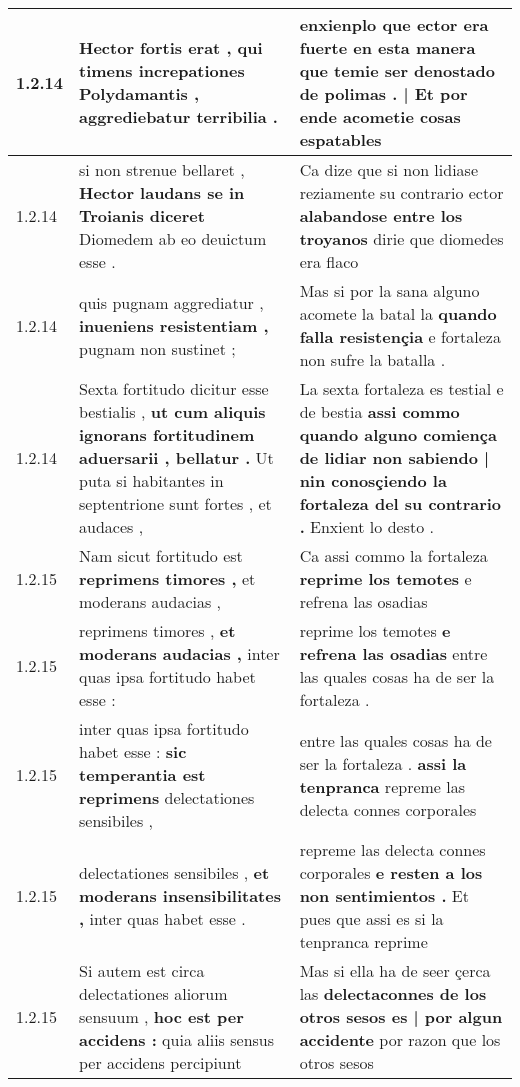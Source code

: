 \begin{tabular}{|p{1cm}|p{6.5cm}|p{6.5cm}|}
1.2.14 & Hector fortis erat , \textbf{ qui timens increpationes Polydamantis , } aggrediebatur terribilia . & enxienplo que ector era fuerte en esta manera \textbf{ que temie ser denostado de polimas . | Et por ende } acometie cosas espatables \\\hline
1.2.14 & si non strenue bellaret , \textbf{ Hector laudans se in Troianis diceret } Diomedem ab eo deuictum esse . & Ca dize que si non lidiase reziamente su contrario ector \textbf{ alabandose entre los troyanos } dirie que diomedes era flaco \\\hline
1.2.14 & quis pugnam aggrediatur , \textbf{ inueniens resistentiam , } pugnam non sustinet ; & Mas si por la sana alguno acomete la batal la \textbf{ quando falla resistençia } e fortaleza non sufre la batalla . \\\hline
1.2.14 & Sexta fortitudo dicitur esse bestialis , \textbf{ ut cum aliquis ignorans fortitudinem aduersarii , bellatur . } Ut puta si habitantes in septentrione sunt fortes , et audaces , & La sexta fortaleza es testial e de bestia \textbf{ assi commo quando alguno comiença de lidiar non sabiendo | nin conosçiendo la fortaleza del su contrario . } Enxient lo desto . \\\hline
1.2.15 & Nam sicut fortitudo est \textbf{ reprimens timores , } et moderans audacias , & Ca assi commo la fortaleza \textbf{ reprime los temotes } e refrena las osadias \\\hline
1.2.15 & reprimens timores , \textbf{ et moderans audacias , } inter quas ipsa fortitudo habet esse : & reprime los temotes \textbf{ e refrena las osadias } entre las quales cosas ha de ser la fortaleza . \\\hline
1.2.15 & inter quas ipsa fortitudo habet esse : \textbf{ sic temperantia est reprimens } delectationes sensibiles , & entre las quales cosas ha de ser la fortaleza . \textbf{ assi la tenpranca } repreme las delecta connes corporales \\\hline
1.2.15 & delectationes sensibiles , \textbf{ et moderans insensibilitates , } inter quas habet esse . & repreme las delecta connes corporales \textbf{ e resten a los non sentimientos . } Et pues que assi es si la tenpranca reprime \\\hline
1.2.15 & Si autem est circa delectationes aliorum sensuum , \textbf{ hoc est per accidens : } quia aliis sensus per accidens percipiunt & Mas si ella ha de seer çerca las \textbf{ delectaconnes de los otros sesos es | por algun accidente } por razon que los otros sesos \\\hline

\end{tabular}
